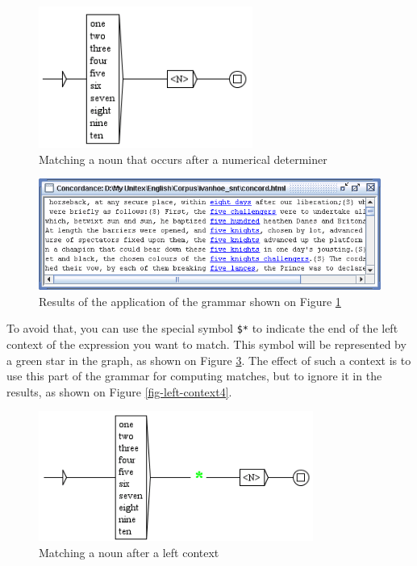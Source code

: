 \begin{figure}[!ht]
\begin{center}
\includegraphics[width=7cm]{resources/img/fig6-17a.png}
\caption{Matching a noun that occurs after a numerical
determiner\label{fig-left-context1}}
\end{center}
\end{figure}

\begin{figure}[!ht]
\begin{center}
\includegraphics[width=14cm]{resources/img/fig6-17b.png}
\caption{Results of the application of the grammar shown on Figure
\ref{fig-left-context1}\label{fig-left-context2}}
\end{center}
\end{figure}

\bigskip
\noindent To avoid that, you can use the special symbol \verb+$*+ to indicate
the end of the left context of the expression you want to match. This symbol
will be represented by a green star in the graph, as shown on Figure
\ref{fig-left-context3}. The effect of such a context is to use this part of the
grammar for computing matches, but to ignore it in the results, as shown on
Figure \ref{fig-left-context4}.

\begin{figure}[!ht]
\begin{center}
\includegraphics[width=9cm]{resources/img/fig6-17c.png}
\caption{Matching a noun after a left context\label{fig-left-context3}}
\end{center}
\end{figure}

